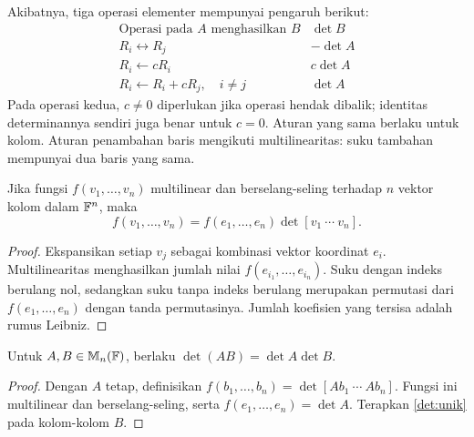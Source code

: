 Akibatnya, tiga operasi elementer mempunyai pengaruh berikut:
\[
      \begin{array}{c|c}
            \text{Operasi pada }A\text{ menghasilkan }B & \det B  \\ \hline
            R_i\leftrightarrow R_j                      & -\det A \\
            R_i\leftarrow cR_i                          & c\det A \\
            R_i\leftarrow R_i+cR_j,\quad i\ne j         & \det A
      \end{array}
\]
Pada operasi kedua, $c\ne0$ diperlukan jika operasi hendak dibalik;
identitas determinannya sendiri juga benar untuk $c=0$.
Aturan yang sama berlaku untuk kolom. Aturan penambahan baris mengikuti
multilinearitas: suku tambahan mempunyai dua baris yang sama.

\begin{lem}
      \label{det:unik}
      Jika fungsi $f(v_1,\ldots,v_n)$ multilinear dan berselang-seling
      terhadap $n$ vektor kolom dalam $\mathbb{F}^n$, maka
      \[
            f(v_1,\ldots,v_n)=f(e_1,\ldots,e_n)\det[v_1\ \cdots\ v_n].
      \]
\end{lem}
\begin{proof}
      Ekspansikan setiap $v_j$ sebagai kombinasi vektor koordinat $e_i$.
      Multilinearitas menghasilkan jumlah nilai $f(e_{i_1},\ldots,e_{i_n})$.
      Suku dengan indeks berulang nol, sedangkan suku tanpa indeks berulang
      merupakan permutasi dari $f(e_1,\ldots,e_n)$ dengan tanda permutasinya.
      Jumlah koefisien yang tersisa adalah rumus Leibniz.
\end{proof}

\begin{thm}
      \label{det:produk}
      Untuk $A,B\in\mathbb{M}_n(\mathbb{F})$, berlaku $\det(AB)=\det A\det B$.
\end{thm}
\begin{proof}
      Dengan $A$ tetap, definisikan
      $f(b_1,\ldots,b_n)=\det[Ab_1\ \cdots\ Ab_n]$.
      Fungsi ini multilinear dan berselang-seling, serta
      $f(e_1,\ldots,e_n)=\det A$.
      Terapkan \autoref{det:unik} pada kolom-kolom $B$.
\end{proof}

